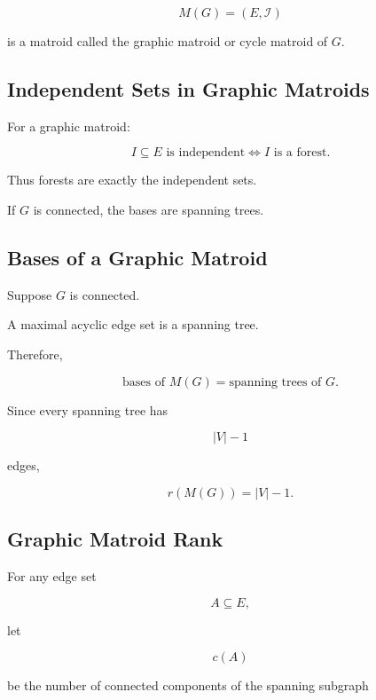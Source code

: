 \[
\boxed{
M(G)
=
(E,\mathcal{I})
}
\]

is a matroid called the graphic matroid or cycle matroid of \(G\).

\subsection{Independent Sets in Graphic Matroids}
\label{subsec:graphic-independent-sets}

For a graphic matroid:

\[
\boxed{
I\subseteq E
\text{ is independent}
\iff
I\text{ is a forest}.
}
\]

Thus forests are exactly the independent sets.

If \(G\) is connected, the bases are spanning trees.

\subsection{Bases of a Graphic Matroid}
\label{subsec:graphic-matroid-bases}

Suppose \(G\) is connected.

A maximal acyclic edge set is a spanning tree.

Therefore,

\[
\boxed{
\text{bases of }M(G)
=
\text{spanning trees of }G.
}
\]

Since every spanning tree has

\[
|V|-1
\]

edges,

\[
\boxed{
r(M(G))
=
|V|-1.
}
\]

\subsection{Graphic Matroid Rank}
\label{subsec:graphic-matroid-rank}

For any edge set

\[
A\subseteq E,
\]

let

\[
c(A)
\]

be the number of connected components of the spanning subgraph

